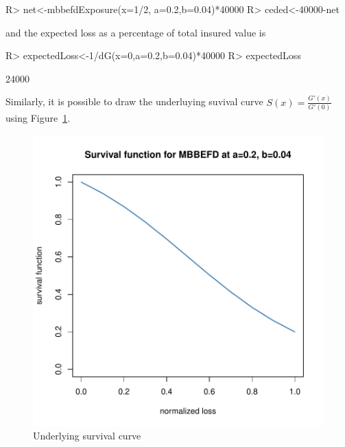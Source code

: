 \documentclass[nojss]{jss}
\begin{document}
\begin{Schunk}
\begin{Sinput}
R> net<-mbbefdExposure(x=1/2, a=0.2,b=0.04)*40000
R> ceded<-40000-net
\end{Sinput}
\end{Schunk}

and the expected loss as a percentage of total insured value is

\begin{Schunk}
\begin{Sinput}
R> expectedLoss<-1/dG(x=0,a=0.2,b=0.04)*40000
R> expectedLoss
\end{Sinput}
\begin{Soutput}
[1] 24000
\end{Soutput}
\end{Schunk}


Similarly, it is possible to draw the underluying suvival curve $S\left( x \right) = \frac{{G'\left( x \right)}}{{G'\left( 0 \right)}}$ using  Figure~\ref{fig:survival}.

\begin{figure}
\begin{center}
\includegraphics{mbbefd-survivalPlot}
\caption{Underlying survival curve}
\label{fig:survival}
\end{center}
\end{figure}
\end{document}
